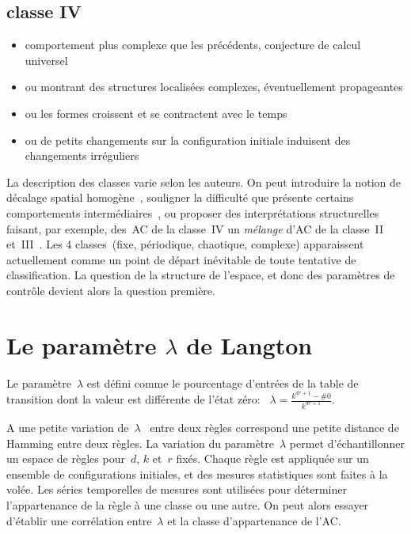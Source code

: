 \subsection*{classe IV}

\begin{itemize}
\item comportement plus complexe que les précédents, conjecture de
  calcul universel
\item ou montrant des structures localisées complexes,
  éventuellement propageantes
\item ou les formes croissent et se contractent avec le temps
\item ou de petits changements sur la configuration initiale
  induisent des changements irréguliers
\end{itemize}

La description des classes varie selon les auteurs. %
On peut introduire la notion de décalage spatial
homogène~\cite[]{Li90b}, %
souligner la difficulté que présente certains comportements
intermédiaires~\cite[]{McIntosh90}, %
ou proposer des interprétations structurelles faisant, par exemple,
des~AC de la classe~IV un \emph{mélange} d'AC de la classe~II
et~III~\cite[]{Kayama93}. %
Les 4 classes~(fixe, périodique, chaotique, complexe) apparaissent
actuellement comme un point de départ inévitable de toute tentative de
classification. %
La question de la structure de l'espace, et donc des paramètres de
contrôle devient alors la question première.

\section{Le paramètre $\lambda$ de Langton}
\label{ref-lambda}

Le paramètre~$\lambda$ est défini comme le pourcentage d'entrées de la
table de transition dont la valeur est différente de l'état zéro:~%
$\lambda = \frac{k^{dr+1}-\#0}{k^{dr+1}}$. %

A une petite variation de~$\lambda$~\cite[]{Langton92b} entre deux
règles correspond une petite distance de Hamming entre deux règles. %
La variation du paramètre~$\lambda$ permet d'échantillonner
un espace de règles pour~$d$, $k$ et~$r$ fixés. %
Chaque règle est appliquée sur un ensemble de configurations
initiales, et des mesures statistiques sont faites à la volée. %
Les séries temporelles de mesures sont utilisées pour déterminer
l'appartenance de la règle à une classe ou une autre. %
On peut alors essayer d'établir une corrélation entre~$\lambda$
et la classe d'appartenance de l'AC. %


